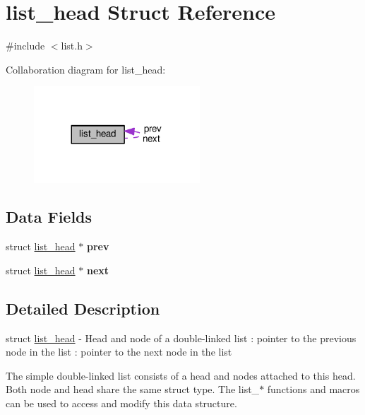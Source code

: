 \hypertarget{structlist__head}{}\section{list\+\_\+head Struct Reference}
\label{structlist__head}


{\ttfamily \#include $<$list.\+h$>$}



Collaboration diagram for list\+\_\+head\+:
\nopagebreak
\begin{figure}[H]
\begin{center}
\leavevmode
\includegraphics[width=176pt]{structlist__head__coll__graph}
\end{center}
\end{figure}
\subsection*{Data Fields}
\begin{DoxyCompactItemize}
\item 
struct \hyperlink{structlist__head}{list\+\_\+head} $\ast$ {\bfseries prev}\hypertarget{structlist__head_ad8f06cb209b17c3a4a5b24cad8793f72}{}\label{structlist__head_ad8f06cb209b17c3a4a5b24cad8793f72}

\item 
struct \hyperlink{structlist__head}{list\+\_\+head} $\ast$ {\bfseries next}\hypertarget{structlist__head_afb6f2172d12efd37f00bb623a6885f2a}{}\label{structlist__head_afb6f2172d12efd37f00bb623a6885f2a}

\end{DoxyCompactItemize}


\subsection{Detailed Description}
struct \hyperlink{structlist__head}{list\+\_\+head} -\/ Head and node of a double-\/linked list \+: pointer to the previous node in the list \+: pointer to the next node in the list

The simple double-\/linked list consists of a head and nodes attached to this head. Both node and head share the same struct type. The list\+\_\+$\ast$ functions and macros can be used to access and modify this data structure.


